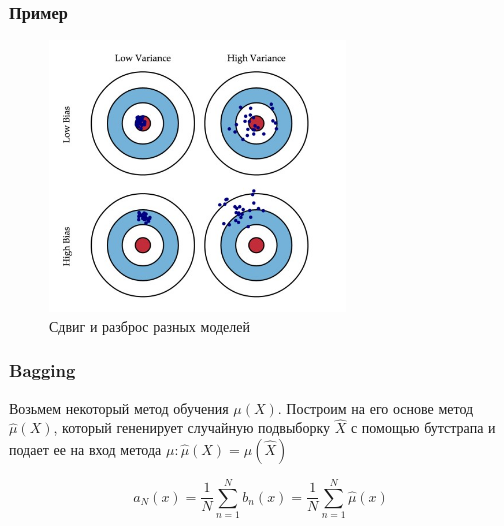 \documentclass[fleqn,pdf, 9pt, usenames, dvipsnames, unicode, hyperref={bookmarks=true,bookmarksopen=false, bookmarksnumbered}]{beamer}
\begin{document}

\begin{frame}\frametitle{Пример}

\begin{figure}[!ht]
	\centering
	\includegraphics[width=0.7\textwidth]{bias_var.jpg}
	\caption{Сдвиг и разброс разных моделей}
	\label{fig:bias_var}
\end{figure}

\end{frame}


\begin{frame}\frametitle{Bagging}

Возьмем некоторый метод обучения $\mu(X)$. Построим на его основе метод $\hat{\mu}(X)$, который гененирует случайную подвыборку $\hat{X}$ с помощью бутстрапа и подает ее на вход метода $\mu: \hat{\mu}(X) = \mu(\hat{X})$

\begin{equation}
	{a}_{N}(x) = \dfrac{1}{N}\sum_{n=1}^{N}b_n(x) = \dfrac{1}{N}\sum_{n=1}^{N}\hat{\mu}(x)
\end{equation}

\end{frame}

\end{document}
